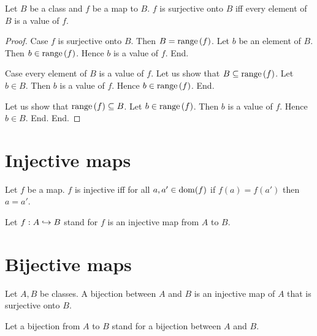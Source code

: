 \documentclass[../../set-theory/set-theory.tex]{subfiles}
\begin{document}
  \begin{forthel}
    \begin{proposition}
      Let $B$ be a class and $f$ be a map to $B$.
      $f$ is surjective onto $B$ iff every element of $B$ is a value of $f$.
    \end{proposition}
    \begin{proof}
      Case $f$ is surjective onto $B$.
        Then $B = \mathrm{range}\left(f\right)$.
        Let $b$ be an element of $B$.
        Then $b \in \mathrm{range}\left(f\right)$.
        Hence $b$ is a value of $f$.
      End.

      Case every element of $B$ is a value of $f$.
        Let us show that $B \subseteq \mathrm{range}\left(f\right)$.
          Let $b \in B$.
          Then $b$ is a value of $f$.
          Hence $b \in \mathrm{range}\left(f\right)$.
        End.

        Let us show that $\mathrm{range}\left(f\right) \subseteq B$.
          Let $b \in \mathrm{range}\left(f\right)$.
          Then $b$ is a value of $f$.
          Hence $b \in B$.
        End.
      End.
    \end{proof}
  \end{forthel}


  \section{Injective maps}

  \begin{forthel}
    \begin{definition}
      Let $f$ be a map.
      $f$ is injective iff for all $a, a' \in \operatorname{dom}(f)$ if $f(a) = f(a')$ then
      $a = a'$.
    \end{definition}

    Let $f: A \hookrightarrow B$ stand for $f$ is an injective map from $A$ to $B$.
  \end{forthel}


  \section{Bijective maps}

  \begin{forthel}
    \begin{definition}
      Let $A, B$ be classes.
      A bijection between $A$ and $B$ is an injective map of $A$ that is
      surjective onto $B$.
    \end{definition}

    Let a bijection from $A$ to $B$ stand for a bijection between $A$ and $B$.
  \end{forthel}
\end{document}
